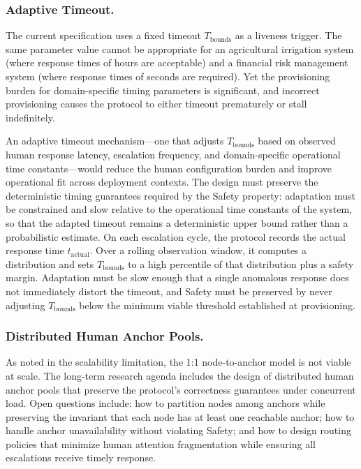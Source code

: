 \subsubsection{Adaptive Timeout.}
The current specification uses a fixed timeout $T_{\text{bounds}}$ as a liveness trigger. The same parameter value cannot be appropriate for an agricultural irrigation system (where response times of hours are acceptable) and a financial risk management system (where response times of seconds are required). Yet the provisioning burden for domain-specific timing parameters is significant, and incorrect provisioning causes the protocol to either timeout prematurely or stall indefinitely.

An adaptive timeout mechanism---one that adjusts $T_{\text{bounds}}$ based on observed human response latency, escalation frequency, and domain-specific operational time constants---would reduce the human configuration burden and improve operational fit across deployment contexts. The design must preserve the deterministic timing guarantees required by the Safety property: adaptation must be constrained and slow relative to the operational time constants of the system, so that the adapted timeout remains a deterministic upper bound rather than a probabilistic estimate. On each escalation cycle, the protocol records the actual response time $t_{\text{actual}}$. Over a rolling observation window, it computes a distribution and sets $T_{\text{bounds}}$ to a high percentile of that distribution plus a safety margin. Adaptation must be slow enough that a single anomalous response does not immediately distort the timeout, and Safety must be preserved by never adjusting $T_{\text{bounds}}$ below the minimum viable threshold established at provisioning.

\subsubsection{Distributed Human Anchor Pools.}
As noted in the scalability limitation, the 1:1 node-to-anchor model is not viable at scale. The long-term research agenda includes the design of distributed human anchor pools that preserve the protocol's correctness guarantees under concurrent load. Open questions include: how to partition nodes among anchors while preserving the invariant that each node has at least one reachable anchor; how to handle anchor unavailability without violating Safety; and how to design routing policies that minimize human attention fragmentation while ensuring all escalations receive timely response.

